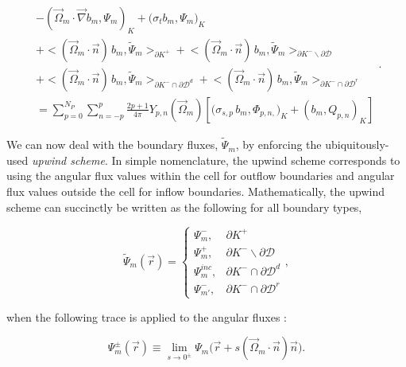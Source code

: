 \begin{equation}
\label{eq::Sn_DGFEM_trans_eq_cellK_diff_faces}
\begin{aligned}
- \left( \vec{\Omega}_m \cdot  \vec{\nabla} b_m, \Psi_{m} \right)_{K}   + \Big(  \sigma_{t} b_m ,   \Psi_{m} \Big)_{K}  \\
+  \Big< ( \vec{\Omega}_m \cdot \vec{n} ) \, b_m, \tilde{\Psi}_m  \Big>_{\partial K^+}  + \Big< ( \vec{\Omega}_m \cdot \vec{n} ) \, b_m, \tilde{\Psi}_m  \Big>_{\partial K^- \backslash \partial \mathcal{D}} \\
  + \Big< ( \vec{\Omega}_m \cdot \vec{n} ) \, b_m, \tilde{\Psi}_m  \Big>_{\partial K^- \cap \partial \mathcal{D}^d}  + \Big< ( \vec{\Omega}_m \cdot \vec{n} ) \, b_m, \tilde{\Psi}_m  \Big>_{\partial K^- \cap \partial \mathcal{D}^r}  \\
= \sum_{p=0}^{N_P} \sum_{n=-p}^{p} \frac{2p + 1}{4 \pi}  Y_{p,n} (  \vec{\Omega}_m ) \left[ \Big( \sigma_{s,p} \, b_m,  \Phi_{p,n,} \Big)_{K}  + \left(  b_m ,   Q_{p,n} \right)_{K} \right]
\end{aligned} .
\end{equation}

We can now deal with the boundary fluxes, $\tilde{\Psi}_m$, by enforcing the ubiquitously-used {\em upwind scheme}. In simple nomenclature, the upwind scheme corresponds to using the angular flux values within the cell for outflow boundaries and angular flux values outside the cell for inflow boundaries. Mathematically, the upwind scheme can succinctly be written as the following for all boundary types,

\begin{equation}
\label{eq::Sn_upwind_cases}
\tilde{\Psi}_m (\vec{r}) = \begin{cases}
\Psi_m^{-} , & \partial K^+ \\
\Psi_m^{+}, & \partial K^- \backslash \partial \mathcal{D} \\
\Psi_m^{inc}, & \partial K^- \cap \partial \mathcal{D}^d \\
\Psi_{m'}^{-}, & \partial K^- \cap \partial \mathcal{D}^r
\end{cases} ,
\end{equation}

\noindent when the following trace is applied to the angular fluxes :

\begin{equation}
\label{eq::Sn_ang_flux_trace}
\Psi_m^{\pm} (\vec{r}) \equiv \lim_{s \rightarrow 0^{\pm}} \Psi_m \Big( \vec{r} + s (\vec{\Omega}_m \cdot \vec{n}) \vec{n} \Big) .
\end{equation}

